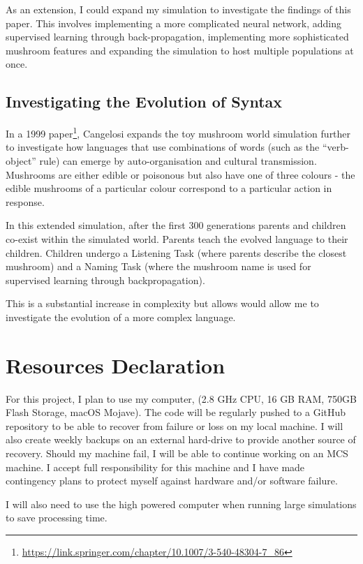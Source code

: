 \documentclass[12pt,a4paper,twoside]{article}
\begin{document}
As an extension, I could expand my simulation to investigate the findings of this paper. This involves implementing a more complicated neural network, adding supervised learning through back-propagation, implementing more sophisticated mushroom features and expanding the simulation to host multiple populations at once.

\subsection*{Investigating the Evolution of Syntax}

In a 1999 paper\footnote{\url{https://link.springer.com/chapter/10.1007/3-540-48304-7_86}}, Cangelosi expands the toy mushroom world simulation further to investigate how languages that use combinations of words (such as the ``verb-object'' rule) can emerge by auto-organisation and cultural transmission. Mushrooms are either edible or poisonous but also have one of three colours - the edible mushrooms of a particular colour correspond to a particular action in response.

In this extended simulation, after the first 300 generations parents and children co-exist within the simulated world. Parents teach the evolved language to their children. Children undergo a Listening Task (where parents describe the closest mushroom) and a Naming Task (where the mushroom name is used for supervised learning through backpropagation).

This is a substantial increase in complexity but allows would allow me to investigate the evolution of a more complex language.

 \section*{Resources Declaration}

For this project, I plan to use my computer, (2.8 GHz CPU, 16 GB RAM, 750GB Flash Storage,
macOS Mojave). The code will be regularly pushed to a GitHub repository to be able to recover from failure or loss on my local machine. I will also create weekly backups on an external hard-drive to provide another source of recovery. Should my machine fail, I will be able to continue working on an MCS machine. I accept full responsibility for this machine and I have made contingency plans to protect myself against hardware and/or software failure. 

I will also need to use the high powered computer when running large simulations to save processing time.

 
\end{document}
